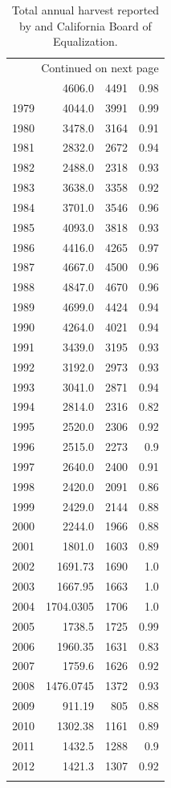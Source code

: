 \documentclass[a4paper,titlepage]{article}
\begin{document}
\begin{longtable}{rrrr}
\hline
\endhead
\hline\multicolumn{4}{r}{Continued on next page} \\
\endfoot
\endlastfoot
\hline
1978 & 4606.0 & 4491 & 0.98\\
1979 & 4044.0 & 3991 & 0.99\\
1980 & 3478.0 & 3164 & 0.91\\
1981 & 2832.0 & 2672 & 0.94\\
1982 & 2488.0 & 2318 & 0.93\\
1983 & 3638.0 & 3358 & 0.92\\
1984 & 3701.0 & 3546 & 0.96\\
1985 & 4093.0 & 3818 & 0.93\\
1986 & 4416.0 & 4265 & 0.97\\
1987 & 4667.0 & 4500 & 0.96\\
1988 & 4847.0 & 4670 & 0.96\\
1989 & 4699.0 & 4424 & 0.94\\
1990 & 4264.0 & 4021 & 0.94\\
1991 & 3439.0 & 3195 & 0.93\\
1992 & 3192.0 & 2973 & 0.93\\
1993 & 3041.0 & 2871 & 0.94\\
1994 & 2814.0 & 2316 & 0.82\\
1995 & 2520.0 & 2306 & 0.92\\
1996 & 2515.0 & 2273 & 0.9\\
1997 & 2640.0 & 2400 & 0.91\\
1998 & 2420.0 & 2091 & 0.86\\
1999 & 2429.0 & 2144 & 0.88\\
2000 & 2244.0 & 1966 & 0.88\\
2001 & 1801.0 & 1603 & 0.89\\
2002 & 1691.73 & 1690 & 1.0\\
2003 & 1667.95 & 1663 & 1.0\\
2004 & 1704.0305 & 1706 & 1.0\\
2005 & 1738.5 & 1725 & 0.99\\
2006 & 1960.35 & 1631 & 0.83\\
2007 & 1759.6 & 1626 & 0.92\\
2008 & 1476.0745 & 1372 & 0.93\\
2009 & 911.19 & 805 & 0.88\\
2010 & 1302.38 & 1161 & 0.89\\
2011 & 1432.5 & 1288 & 0.9\\
2012 & 1421.3 & 1307 & 0.92\\
\caption{Total annual harvest reported by \citet{Mciver2012} and California Board of Equalization.\label{tab:tpo_boe}}
\\
\end{longtable}
\end{document}
